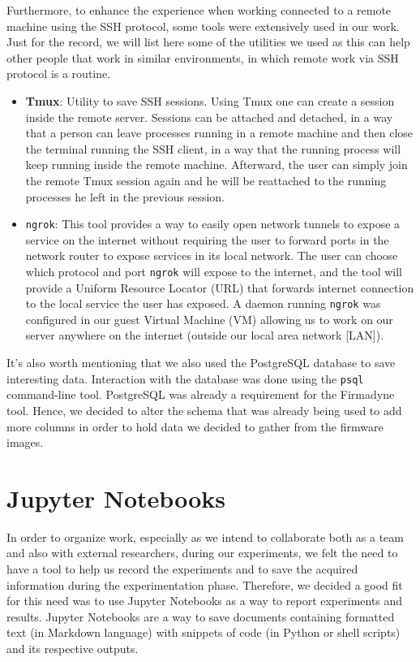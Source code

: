 Furthermore, to enhance the experience when working connected to a remote machine using the SSH protocol, some tools were extensively used in our work. Just for the record, we will list here some of the utilities we used as this can help other people that work in similar environments, in which remote work via SSH protocol is a routine.

\begin{itemize}
    \item \textbf{Tmux}: Utility to save SSH sessions. Using Tmux one can create a session inside the remote server. Sessions can be attached and detached, in a way that a person can leave processes running in a remote machine and then close the terminal running the SSH client, in a way that the running process will keep running inside the remote machine. Afterward, the user can simply join the remote Tmux session again and he will be reattached to the running processes he left in the previous session.
    
    \item {\tt ngrok}: This tool provides a way to easily open network tunnels to expose a service on the internet without requiring the user to forward ports in the network router to expose services in its local network. The user can choose which protocol and port {\tt ngrok} will expose to the internet, and the tool will provide a Uniform Resource Locator (URL) that forwards internet connection to the local service the user has exposed. A daemon running {\tt ngrok} was configured in our guest Virtual Machine (VM) allowing us to work on our server anywhere on the internet (outside our local area network [LAN]).
\end{itemize}

It's also worth mentioning that we also used the PostgreSQL database to save interesting data. Interaction with the database was done using the {\tt psql} command-line tool. PostgreSQL was already a requirement for the Firmadyne~\cite{firmadyne} tool. Hence, we decided to alter the schema that was already being used to add more columns in order to hold data we decided to gather from the firmware images.

\section{Jupyter Notebooks}

In order to organize work, especially as we intend to collaborate both as a team and also with external researchers, during our experiments, we felt the need to have a tool to help us record the experiments and to save the acquired information during the experimentation phase. Therefore, we decided a good fit for this need was to use Jupyter Notebooks as a way to report experiments and results. Jupyter Notebooks are a way to save documents containing formatted text (in Markdown language) with snippets of code (in Python or shell scripts) and its respective outputs.

